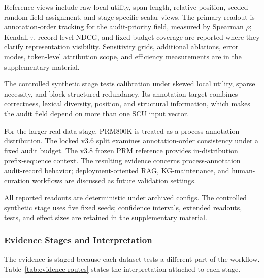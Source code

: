 \documentclass[pdflatex,sn-mathphys-num,iicol]{sn-jnl}
\begin{document}
Reference views include raw local utility, span length, relative position, seeded random field assignment, and stage-specific scalar views. The primary readout is annotation-order tracking for the audit-priority field, measured by Spearman $\rho$; Kendall $\tau$, record-level NDCG, and fixed-budget coverage are reported where they clarify representation visibility. Sensitivity grids, additional ablations, error modes, token-level attribution scope, and efficiency measurements are in the supplementary material.

The controlled synthetic stage tests calibration under skewed local utility, sparse necessity, and block-structured redundancy. Its annotation target combines correctness, lexical diversity, position, and structural information, which makes the audit field depend on more than one SCU input vector.

For the larger real-data stage, PRM800K is treated as a process-annotation distribution. The locked v3.6 split examines annotation-order consistency under a fixed audit budget. The v3.8 frozen PRM reference provides in-distribution prefix-sequence context. The resulting evidence concerns process-annotation audit-record behavior; deployment-oriented RAG, KG-maintenance, and human-curation workflows are discussed as future validation settings.

All reported readouts are deterministic under archived configs. The controlled synthetic stage uses five fixed seeds; confidence intervals, extended readouts, tests, and effect sizes are retained in the supplementary material.

\subsubsection{Evidence Stages and Interpretation}

The evidence is staged because each dataset tests a different part of the workflow. Table~\ref{tab:evidence-routes} states the interpretation attached to each stage.
\end{document}
